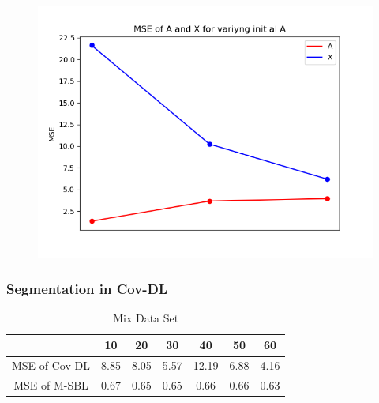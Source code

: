 \begin{figure}[H]
\centering
\includegraphics[scale=0.5]{figures/chapter6/AR_Error_initial_A_m8_k16_L1000.png}
\label{fig:initialA_AR}
\caption{}
\end{figure}
\noindent



%


\subsubsection{Segmentation in Cov-DL}

\begin{table}[H]
\centering
\begin{tabular}{|c|c|c|c|c|c|c|}
\hline 
 & 10 & 20 & 30 & 40 & 50 & 60 \\ 
\hline 
MSE of Cov-DL & 8.85 & 8.05 & 5.57 & 12.19 & 6.88 & 4.16 \\ 
\hline 
MSE of M-SBL  & 0.67 & 0.65 & 0.65 & 0.66  & 0.66 & 0.63 \\ 
\hline
\end{tabular} 
\caption{Mix Data Set}
\end{table}

